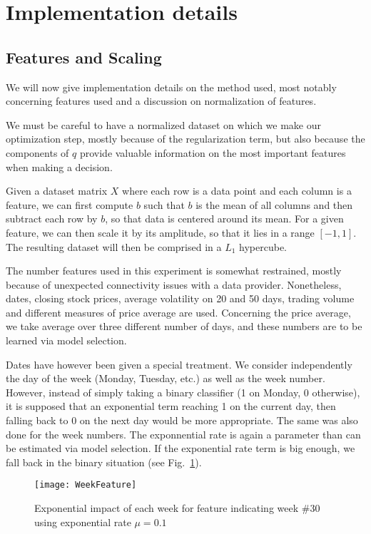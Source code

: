 \documentclass[11pt,fleqn]{article}
\newcommand{\figref}[1]{Fig.~\ref{#1}}
\begin{document}
\section{Implementation details}

\subsection{Features and Scaling}

We will now give implementation details on the method used, most notably concerning
features used and a discussion on normalization of features.

We must be careful to have a normalized dataset on which we make our optimization step,
mostly because of the regularization term, but also because the components of $q$ provide
valuable information on the most important features when making a decision. 

Given a dataset matrix $X$ where each row is a data point and each column is a feature, we
can first compute $b$ such that $b$ is the mean of all columns and then subtract each row
by $b$, so that data is centered around its mean. For a given feature, we can then scale
it by its amplitude, so that it lies in a range $[-1,1]$. The resulting dataset will then
be comprised in a $L_1$ hypercube. 

The number features used in this experiment is somewhat restrained, mostly because of
unexpected connectivity issues with a data provider. Nonetheless, dates, closing stock
prices, average volatility on 20 and 50 days, trading volume and different measures of
price average are used. Concerning the price average, we take average over three different
number of days, and these numbers are to be learned via model selection. 

Dates have however been given a special treatment. We consider independently the day of
the week (Monday, Tuesday, etc.) as well as the week number. However, instead of simply
taking a binary classifier (1 on Monday, 0 otherwise), it is supposed that an exponential
term reaching 1 on the current day, then falling back to 0 on the next day would be more
appropriate. The same was also done for the week numbers. The exponnential rate is again a
parameter than can be estimated via model selection. If the exponential rate term is big
enough, we fall back in the binary situation (see \figref{fig:weekfeature}).

\begin{figure}
  \centering
  \texttt{[image: WeekFeature]}
  \caption{Exponential impact of each week for feature indicating week \#30 using
    exponential rate $\mu=0.1$}
  \label{fig:weekfeature}
\end{figure}
\end{document}
